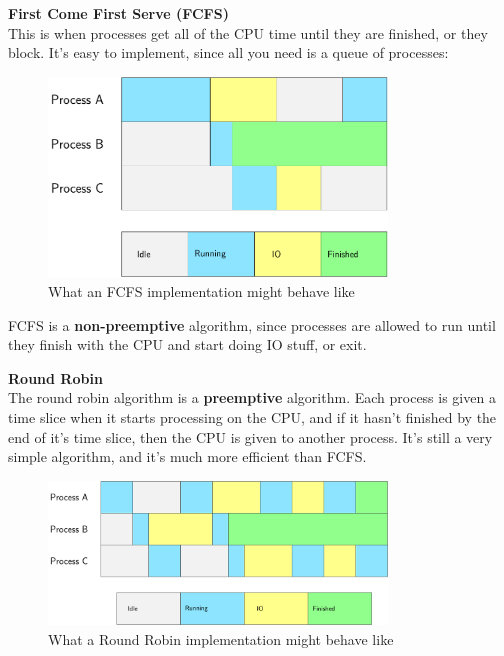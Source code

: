 \begin{description}
  \item \textbf{First Come First Serve (FCFS)}\\
    This is when processes get all of the CPU time until they are finished, or
    they block. It's easy to implement, since all you need is a queue of
    processes:

    \begin{figure}[ht!]
      \centering
      \includegraphics[width=90mm]{diagrams/fcfs.pdf}
      \caption{What an FCFS implementation might behave like}
      \label{fcfs}
    \end{figure}

    FCFS is a \textbf{non-preemptive} algorithm, since processes are allowed to
    run until they finish with the CPU and start doing IO stuff, or exit.


  \item \textbf{Round Robin}\\
    The round robin algorithm is a \textbf{preemptive} algorithm. Each process
    is given a time slice when it starts processing on the CPU, and if it hasn't
    finished by the end of it's time slice, then the CPU is given to another
    process. It's still a very simple algorithm, and it's much more efficient
    than FCFS.

    \begin{figure}[ht!]
      \centering
      \includegraphics[width=90mm]{diagrams/roundrobin.pdf}
      \caption{What a Round Robin implementation might behave like}
      \label{roundrobin}
    \end{figure}


\end{description}
